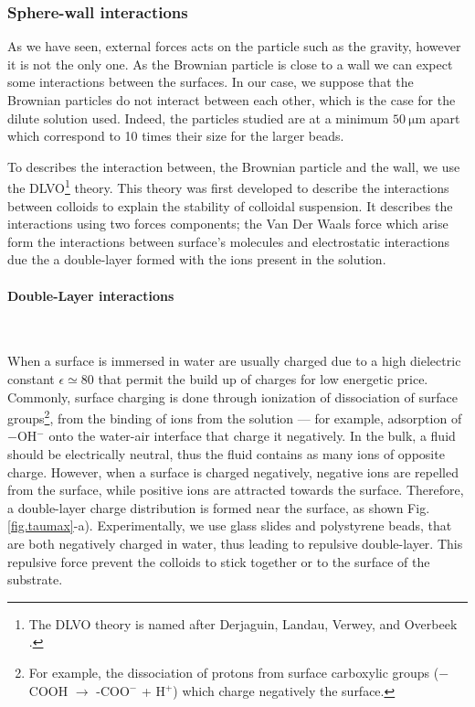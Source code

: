 \subsubsection{Sphere-wall interactions}
\label{Section:sphere-wall}

As we have seen, external forces acts on the particle such as the gravity, however it is not the only one. As the Brownian particle is close to a wall we can expect some interactions between the surfaces. In our case, we suppose that the Brownian particles do not interact between each other, which is the case for the dilute solution used. Indeed, the particles studied are at a minimum $50 ~ \mathrm{\mu m}$ apart which correspond to 10 times their size for the larger beads. 

To describes the interaction between, the Brownian particle and the wall, we use the DLVO\footnote{The DLVO theory is named after Derjaguin, Landau, Verwey, and Overbeek \cite{israelachvili_intermolecular_2015}.} theory. This theory was first developed to describe the interactions between colloids to explain the stability of colloidal suspension. It describes the interactions using two forces components; the Van Der Waals force which arise form the interactions between surface's molecules and electrostatic interactions due the a double-layer formed with the ions present in the solution. 

\paragraph{Double-Layer interactions}\mbox{}\\
\vspace{0.10cm}


When a surface is immersed in water are usually charged \cite{israelachvili_intermolecular_2015} due to a high dielectric constant $\epsilon \simeq 80$ that permit the build up of charges for low energetic price. Commonly, surface charging is done through ionization of dissociation of surface groups\footnote{For example, the dissociation of protons from surface carboxylic groups \cite{israelachvili_intermolecular_2015} ($-$COOH $\rightarrow$ -COO$^-$ + H$^+$) which charge negatively the surface.}, from the binding of ions from the solution --- for example, adsorption of $-$OH$^-$ onto the water-air interface that charge it negatively. In the bulk, a fluid should be electrically neutral, thus the fluid contains as many ions of opposite charge. However, when a surface is charged negatively, negative ions are repelled from the surface, while positive ions are attracted towards the surface.  Therefore, a double-layer charge distribution is formed near the surface, as shown Fig.\ref{fig.taumax}-a). Experimentally, we use glass slides and polystyrene beads, that are both negatively charged in water, thus leading to repulsive double-layer. This repulsive force prevent the colloids to stick together or to the surface of the substrate. 






